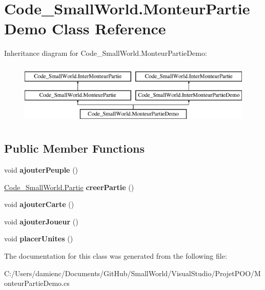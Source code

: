 \hypertarget{class_code___small_world_1_1_monteur_partie_demo}{\section{Code\-\_\-\-Small\-World.\-Monteur\-Partie\-Demo Class Reference}
\label{class_code___small_world_1_1_monteur_partie_demo}
}
Inheritance diagram for Code\-\_\-\-Small\-World.\-Monteur\-Partie\-Demo\-:\begin{figure}[H]
\begin{center}
\leavevmode
\includegraphics[height=3.000000cm]{class_code___small_world_1_1_monteur_partie_demo}
\end{center}
\end{figure}
\subsection*{Public Member Functions}
\begin{DoxyCompactItemize}
\item 
\hypertarget{class_code___small_world_1_1_monteur_partie_demo_a9a44ef267e3b9fa5b0fef9c680d916bd}{void {\bfseries ajouter\-Peuple} ()}\label{class_code___small_world_1_1_monteur_partie_demo_a9a44ef267e3b9fa5b0fef9c680d916bd}

\item 
\hypertarget{class_code___small_world_1_1_monteur_partie_demo_ac579027091c0f053adba26e9a597b4f5}{\hyperlink{interface_code___small_world_1_1_partie}{Code\-\_\-\-Small\-World.\-Partie} {\bfseries creer\-Partie} ()}\label{class_code___small_world_1_1_monteur_partie_demo_ac579027091c0f053adba26e9a597b4f5}

\item 
\hypertarget{class_code___small_world_1_1_monteur_partie_demo_afb127c1d1899948b1eaa4d08531cff94}{void {\bfseries ajouter\-Carte} ()}\label{class_code___small_world_1_1_monteur_partie_demo_afb127c1d1899948b1eaa4d08531cff94}

\item 
\hypertarget{class_code___small_world_1_1_monteur_partie_demo_a2dd24075e89d51b67b350b364e06f764}{void {\bfseries ajouter\-Joueur} ()}\label{class_code___small_world_1_1_monteur_partie_demo_a2dd24075e89d51b67b350b364e06f764}

\item 
\hypertarget{class_code___small_world_1_1_monteur_partie_demo_ac4e3b1234bf35dc370344a0f92cd1fed}{void {\bfseries placer\-Unites} ()}\label{class_code___small_world_1_1_monteur_partie_demo_ac4e3b1234bf35dc370344a0f92cd1fed}

\end{DoxyCompactItemize}


The documentation for this class was generated from the following file\-:\begin{DoxyCompactItemize}
\item 
C\-:/\-Users/damienc/\-Documents/\-Git\-Hub/\-Small\-World/\-Visual\-Studio/\-Projet\-P\-O\-O/Monteur\-Partie\-Demo.\-cs\end{DoxyCompactItemize}
